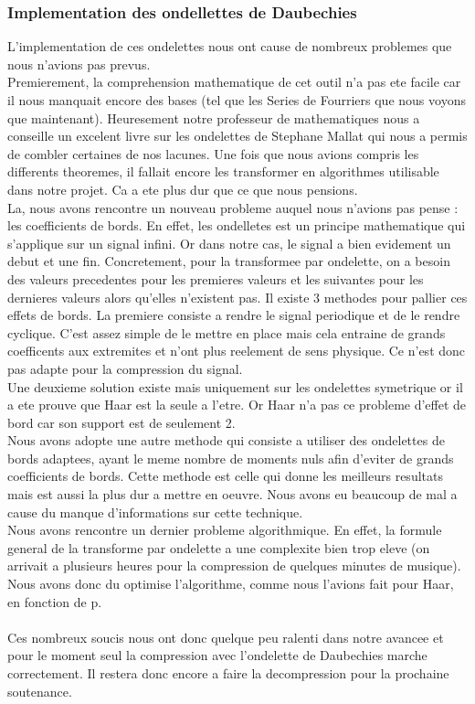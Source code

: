 \documentclass[a4paper,12pt]{article}
\begin{document}
\subsubsection{Implementation des ondellettes de Daubechies}
L'implementation de ces ondelettes nous ont cause de nombreux
problemes que nous n'avions pas prevus.\\
Premierement, la comprehension mathematique de cet outil n'a pas ete
facile car il nous manquait encore des bases (tel que les Series de
Fourriers que nous voyons que maintenant). Heuresement notre
professeur de mathematiques nous a conseille un excelent livre sur les
ondelettes de Stephane Mallat qui nous a permis de combler certaines
de nos lacunes. Une fois que nous avions compris les differents
theoremes, il fallait encore les transformer en algorithmes utilisable
dans notre projet. Ca a ete plus dur que ce que nous pensions.\\
La, nous avons rencontre un nouveau probleme auquel nous n'avions pas
pense : les coefficients de bords. En effet, les ondelletes est un
principe mathematique qui s'applique sur un signal infini. Or dans
notre cas, le signal a bien evidement un debut et une
fin. Concretement, pour la transformee par ondelette, on a besoin des
valeurs precedentes pour les premieres valeurs et les suivantes pour
les dernieres valeurs alors qu'elles n'existent pas. Il existe 3
methodes pour pallier ces effets de bords. La premiere consiste a
rendre le signal periodique et de le rendre cyclique. C'est assez
simple de le mettre en place mais cela entraine de grands coefficents
aux extremites et n'ont plus reelement de sens physique. Ce n'est donc
pas adapte pour la compression du signal.\\
Une deuxieme solution existe mais uniquement sur les ondelettes
symetrique or il a ete prouve que Haar est la seule a l'etre. Or Haar
n'a pas ce probleme d'effet de bord car son support est de seulement
2.\\
Nous avons adopte une autre methode qui consiste a utiliser des
ondelettes de bords adaptees, ayant le meme nombre de moments nuls
afin d'eviter de grands coefficients de bords. Cette methode est celle
qui donne les meilleurs resultats mais est aussi la plus dur a mettre
en oeuvre. Nous avons eu beaucoup de mal a cause du manque
d'informations sur cette technique.\\
Nous avons rencontre un dernier probleme algorithmique. En effet, la
formule general de la transforme par ondelette a une complexite bien
trop eleve (on arrivait a plusieurs heures pour la compression de
quelques minutes de musique). Nous avons donc du optimise
l'algorithme, comme nous l'avions fait pour Haar, en fonction de
p.\\\\
Ces nombreux soucis nous ont donc quelque peu ralenti dans notre
avancee et pour le moment seul la compression avec l'ondelette de
Daubechies marche correctement. Il restera donc encore a faire la
decompression pour la prochaine soutenance.
\end{document}
